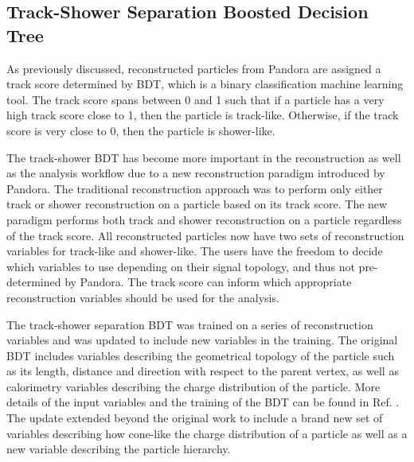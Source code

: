 \subsection{Track-Shower Separation Boosted Decision Tree}
\label{sec:trkshwbdt}

As previously discussed, reconstructed particles from Pandora are assigned a track score determined by BDT, which is a binary classification machine learning tool.
The track score spans between 0 and 1 such that if a particle has a very high track score close to 1, then the particle is track-like.
Otherwise, if the track score is very close to 0, then the particle is shower-like.

The track-shower BDT has become more important in the reconstruction as well as the analysis workflow due to a new reconstruction paradigm introduced by Pandora.                                      
The traditional reconstruction approach was to perform only either track or shower reconstruction on a particle based on its track score.
The new paradigm performs both track and shower reconstruction on a particle regardless of the track score.
All reconstructed particles now have two sets of reconstruction variables for track-like and shower-like.
The users have the freedom to decide which variables to use depending on their signal topology, and thus not pre-determined by Pandora.
The track score can inform which appropriate reconstruction variables should be used for the analysis. 

The track-shower separation BDT was trained on a series of reconstruction variables and was updated to include new variables in the training.
The original BDT includes variables describing the geometrical topology of the particle such as its length, distance and direction with respect to the parent vertex, as well as calorimetry variables describing the charge distribution of the particle.
More details of the input variables and the training of the BDT can be found in Ref. \cite{EdPhD}.
The update extended beyond the original work to include a brand new set of variables describing how cone-like the charge distribution of a particle as well as a new variable describing the particle hierarchy.

